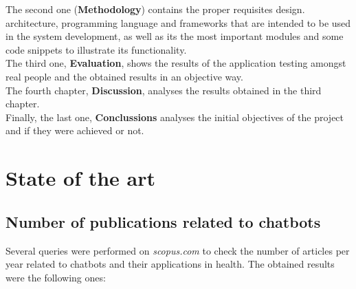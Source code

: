 \documentclass[12pt,english]{article}
\begin{document}
The second one (\textbf{Methodology}) contains the proper requisites design. architecture, programming language and frameworks that are intended to be used in the system development, as well as its the most important modules and some code snippets to illustrate its functionality.\\

The third one, \textbf{Evaluation}, shows the results of the application testing amongst real people and the obtained results in an objective way.\\

The fourth chapter, \textbf{Discussion}, analyses the results obtained in the third chapter.\\

Finally, the last one, \textbf{Conclussions} analyses the initial objectives of the project and if they were achieved or not.



\newpage

\section{State of the art}

\subsection{Number of publications related to chatbots}

Several queries were performed on \textit{scopus.com} to check the number of articles per year related to chatbots and their applications in health. The obtained results were the following ones:
\end{document}
